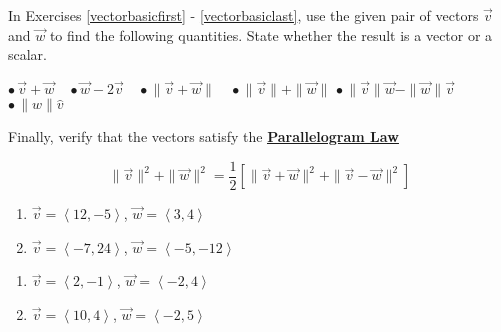 In Exercises \ref{vectorbasicfirst} - \ref{vectorbasiclast}, use the given pair of vectors $\vec{v}$ and $\vec{w}$ to find the following quantities.  State whether the result is a vector or a scalar.  

\medskip

\hspace{.15in} $\bullet \, \vec{v} + \vec{w} \;\;\;$ \hfill $\bullet \, \vec{w}  - 2\vec{v} \;\;\;$ \hfill $\bullet \, \| \vec{v} + \vec{w} \| \;\;\;$ \hfill $\bullet \, \| \vec{v} \| + \| \vec{w} \|$ \hfill $\bullet \, \| \vec{v} \| \vec{w} - \| \vec{w} \| \vec{v}$ \hfill $\bullet \, \|w\| \hat{v}$

\medskip

Finally, verify that the vectors satisfy the \href{http://en.wikipedia.org/wiki/Parallelogram_law}{\underline{\textbf{Parallelogram Law}}}

\[ \|\vec{v}\|^2 + \|\vec{w}\|^2 = \dfrac{1}{2}\left[ \| \vec{v} + \vec{w}\|^2 + \|\vec{v} - \vec{w}\|^2\right] \]

\begin{multicols}{2}

\begin{enumerate}

\item  $\vec{v} = \left<12, -5\right>$, $\vec{w} = \left<3, 4\right>$ \label{vectorbasicfirst}
\item $\vec{v} = \left<-7, 24 \right>$, $\vec{w} = \left<-5, -12\right>$

\setcounter{HW}{\value{enumi}}

\end{enumerate}

\end{multicols}

\begin{multicols}{2}

\begin{enumerate}

\setcounter{enumi}{\value{HW}}

\item $\vec{v} = \left<2, -1 \right>$, $\vec{w} = \left<-2, 4 \right>$
\item $\vec{v} = \left<10, 4 \right>$, $\vec{w} = \left<-2, 5 \right>$

\setcounter{HW}{\value{enumi}}

\end{enumerate}

\end{multicols}

